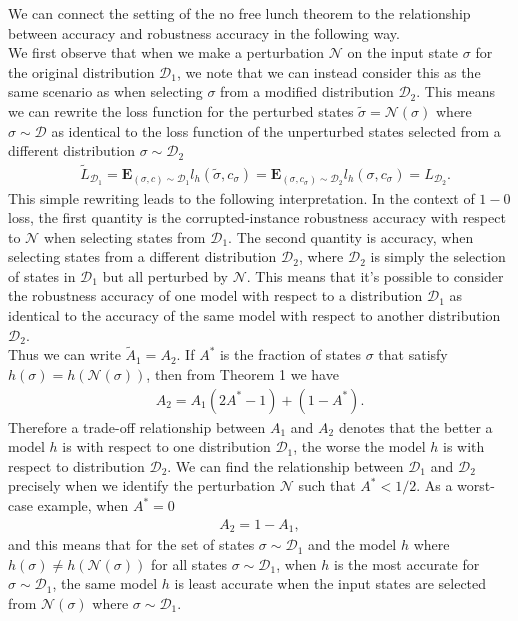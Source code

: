 \documentclass[onecolumn,prx, superscriptaddress,longbibliography,margin=1mm 11pt]{revtex4-2}
\begin{document}
We can connect the setting of the no free lunch theorem to the relationship between accuracy and robustness accuracy in the following way. \\

We first observe that when we make a perturbation $\mathcal{N}$ on the input state $\sigma$ for the original distribution $\mathcal{D}_1$, we note that we can instead consider this as the same scenario as when selecting $\sigma$ from a modified distribution $\mathcal{D}_2$. This means we can rewrite the loss function for the perturbed states $\tilde{\sigma}=\mathcal{N}(\sigma)$ where $\sigma \sim \mathcal{D}$ as identical to the loss function of the unperturbed states selected from a different distribution $\sigma \sim \mathcal{D}_2$
\begin{align}
   &\tilde{L}_{\mathcal{D}_1}=\textbf{E}_{(\sigma,c)\sim \mathcal{D}_1} l_h(\tilde{\sigma}, c_{\sigma})=\textbf{E}_{(\sigma, c_{\sigma})\sim \mathcal{D}_2} l_h(\sigma, c_{\sigma})=L_{\mathcal{D}_2}.
\end{align}
This simple rewriting leads to the following interpretation. In the context of $1-0$ loss, the first quantity is the corrupted-instance robustness accuracy with respect to $\mathcal{N}$ when selecting states from $\mathcal{D}_1$. The second quantity is accuracy, when selecting states from a different distribution $\mathcal{D}_2$, where $\mathcal{D}_2$ is simply the selection of states in $\mathcal{D}_1$ but all perturbed by $\mathcal{N}$. This means that it's possible to consider the robustness accuracy of one model with respect to a distribution $\mathcal{D}_1$ as identical to the accuracy of the same model with respect to another distribution $\mathcal{D}_2$.\\

Thus we can write $\tilde{A}_1=A_2$. If $A^*$ is the fraction of states $\sigma$ that satisfy $h(\sigma)=h(\mathcal{N}(\sigma))$, then from Theorem 1 we have 
\begin{align}
    A_2=A_1(2A^*-1)+(1-A^*).
\end{align}
Therefore a trade-off relationship between $A_1$ and $A_2$ denotes that the better a model $h$ is with respect to one distribution $\mathcal{D}_1$, the worse the model $h$ is with respect to distribution $\mathcal{D}_2$. We can find the relationship between $\mathcal{D}_1$ and $\mathcal{D}_2$ precisely when we identify the perturbation $\mathcal{N}$ such that $A^*<1/2$. As a worst-case example, when $A^*=0$
\begin{align}
    A_2=1-A_1,
\end{align}
and this means that for the set of states $\sigma \sim \mathcal{D}_1$ and the model $h$ where $h(\sigma)\neq h(\mathcal{N}(\sigma))$ for all states $\sigma \sim \mathcal{D}_1$, when $h$ is the most accurate for $\sigma \sim \mathcal{D}_1$, the same model $h$ is least accurate when the input states are selected from $\mathcal{N}(\sigma)$ where $\sigma \sim \mathcal{D}_1$. \\
\end{document}
